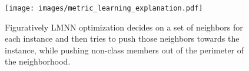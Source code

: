 \begin{figure}
  \begin{center}
  	\vspace{0pt}
  \texttt{[image: images/metric\_learning\_explanation.pdf]}
  \end{center}
  \vspace{-130pt}  
  \captionsetup{font=tiny}
  \caption{ \label{fig:lmnnexplanation} Figuratively LMNN optimization decides on a set of neighbors for each instance and then tries to push those neighbors towards the instance, while pushing non-class members out of the perimeter of the neighborhood. }
  \vspace{0pt}
\end{figure}  
